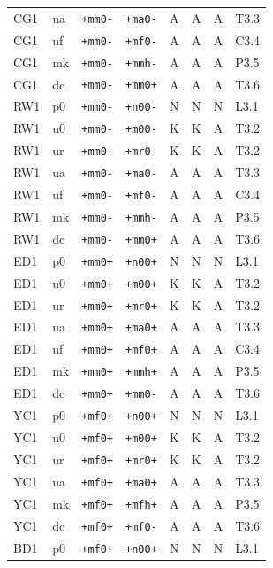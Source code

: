 {\begin{longtable}{@{}llllcccl@{}}
CG1 & ua & \texttt{+mm0-} & \texttt{+ma0-} & A & A & A & T3.3 \\
CG1 & uf & \texttt{+mm0-} & \texttt{+mf0-} & A & A & A & C3.4 \\
CG1 & mk & \texttt{+mm0-} & \texttt{+mmh-} & A & A & A & P3.5 \\
CG1 & dc & \texttt{+mm0-} & \texttt{+mm0+} & A & A & A & T3.6 \\
RW1 & p0 & \texttt{+mm0-} & \texttt{+n00-} & N & N & N & L3.1 \\
RW1 & u0 & \texttt{+mm0-} & \texttt{+m00-} & K & K & A & T3.2 \\
RW1 & ur & \texttt{+mm0-} & \texttt{+mr0-} & K & K & A & T3.2 \\
RW1 & ua & \texttt{+mm0-} & \texttt{+ma0-} & A & A & A & T3.3 \\
RW1 & uf & \texttt{+mm0-} & \texttt{+mf0-} & A & A & A & C3.4 \\
RW1 & mk & \texttt{+mm0-} & \texttt{+mmh-} & A & A & A & P3.5 \\
RW1 & dc & \texttt{+mm0-} & \texttt{+mm0+} & A & A & A & T3.6 \\
ED1 & p0 & \texttt{+mm0+} & \texttt{+n00+} & N & N & N & L3.1 \\
ED1 & u0 & \texttt{+mm0+} & \texttt{+m00+} & K & K & A & T3.2 \\
ED1 & ur & \texttt{+mm0+} & \texttt{+mr0+} & K & K & A & T3.2 \\
ED1 & ua & \texttt{+mm0+} & \texttt{+ma0+} & A & A & A & T3.3 \\
ED1 & uf & \texttt{+mm0+} & \texttt{+mf0+} & A & A & A & C3.4 \\
ED1 & mk & \texttt{+mm0+} & \texttt{+mmh+} & A & A & A & P3.5 \\
ED1 & dc & \texttt{+mm0+} & \texttt{+mm0-} & A & A & A & T3.6 \\
YC1 & p0 & \texttt{+mf0+} & \texttt{+n00+} & N & N & N & L3.1 \\
YC1 & u0 & \texttt{+mf0+} & \texttt{+m00+} & K & K & A & T3.2 \\
YC1 & ur & \texttt{+mf0+} & \texttt{+mr0+} & K & K & A & T3.2 \\
YC1 & ua & \texttt{+mf0+} & \texttt{+ma0+} & A & A & A & T3.3 \\
YC1 & mk & \texttt{+mf0+} & \texttt{+mfh+} & A & A & A & P3.5 \\
YC1 & dc & \texttt{+mf0+} & \texttt{+mf0-} & A & A & A & T3.6 \\
BD1 & p0 & \texttt{+mf0+} & \texttt{+n00+} & N & N & N & L3.1 \\

\end{longtable}}
